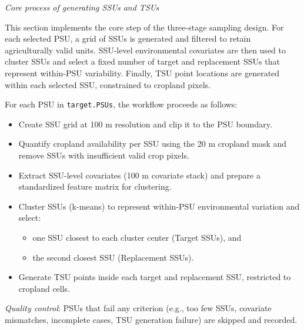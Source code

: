 \documentclass[
  10pt,
  b5paper,
  oneside]{book}
\begin{document}
\emph{Core process of generating SSUs and TSUs}

This section implements the core step of the three-stage sampling design. For each selected PSU, a grid of SSUs is generated and filtered to retain agriculturally valid units. SSU-level environmental covariates are then used to cluster SSUs and select a fixed number of target and replacement SSUs that represent within-PSU variability. Finally, TSU point locations are generated within each selected SSU, constrained to cropland pixels.

For each PSU in \texttt{target.PSUs}, the workflow proceeds as follows:

\begin{itemize}
\item
  Create SSU grid at 100 m resolution and clip it to the PSU boundary.
\item
  Quantify cropland availability per SSU using the 20 m cropland mask and remove SSUs with insufficient valid crop pixels.
\item
  Extract SSU-level covariates (100 m covariate stack) and prepare a standardized feature matrix for clustering.
\item
  Cluster SSUs (k-means) to represent within-PSU environmental variation and select:

  \begin{itemize}
  \item
    one SSU closest to each cluster center (Target SSUs), and
  \item
    the second closest SSU (Replacement SSUs).
  \end{itemize}
\item
  Generate TSU points inside each target and replacement SSU, restricted to cropland cells.
\end{itemize}

\emph{Quality control}: PSUs that fail any criterion (e.g., too few SSUs, covariate mismatches, incomplete cases, TSU generation failure) are skipped and recorded.
\end{document}
